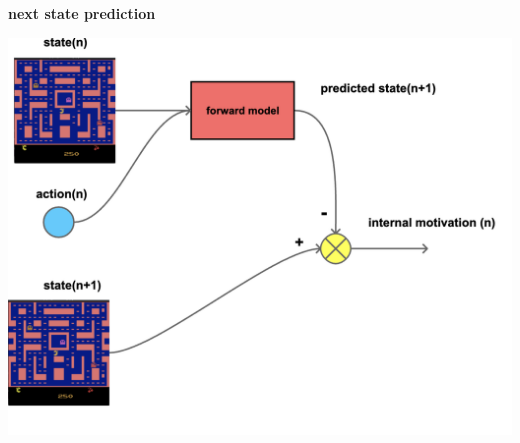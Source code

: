 \documentclass{beamer}
\begin{document}
  
  \begin{frame}{\bf next state prediction}
  
  \centering
  \includegraphics[scale=0.15]{../diagrams/internal_motivation/naive.png}
  
  \end{frame}
  
\end{document}
